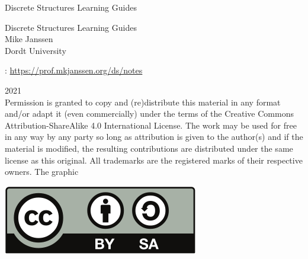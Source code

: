 \documentclass[oneside,10pt,]{book}
\newcommand{\titlepagefont}{\relax}
\numberwithin{equation}{section}
\begin{document}
\frontmatter
\thispagestyle{empty}
{\titlepagefont\centering
\vspace*{0.28\textheight}
{\Huge Discrete Structures Learning Guides}\\}
\clearpage
\thispagestyle{empty}
{\titlepagefont\centering
\vspace*{0.14\textheight}
{\Huge Discrete Structures Learning Guides}\\[3\baselineskip]
{\Large Mike Janssen}\\[0.5\baselineskip]
{\Large Dordt University}\\}
\clearpage
\thispagestyle{empty}
\hypertarget{g:colophon:idm233528964064}{}
: \href{https:\slash{}\slash{}prof.mkjanssen.org\slash{}ds\slash{}notes}{https:\slash{}\slash{}prof.mkjanssen.org\slash{}ds\slash{}notes}\par\medskip
\noindent\textcopyright{}2021\textendash{}\quad{}\\[0.5\baselineskip]
Permission is granted to copy and (re)distribute this material in any format and\slash{}or adapt it (even commercially) under the terms of the Creative Commons Attribution-ShareAlike 4.0 International License.  The work may be used for free in any way by any party so long as attribution is given to the author(s) and if the material is modified, the resulting contributions are distributed under the same license as this original.  All trademarks\texttrademark{} are the registered\textregistered{} marks of their respective owners. The graphic \begin{sidebyside}{1}{0.375}{0.375}{0}%
\begin{sbspanel}{0.25}%
\includegraphics[width=\linewidth]{./img/CC-BY-SA-license.svg}
\end{sbspanel}%
\end{sidebyside}%
\end{document}
